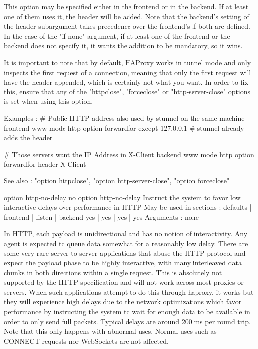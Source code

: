   This option may be specified either in the frontend or in the backend. If at
  least one of them uses it, the header will be added. Note that the backend's
  setting of the header subargument takes precedence over the frontend's if
  both are defined. In the case of the "if-none" argument, if at least one of
  the frontend or the backend does not specify it, it wants the addition to be
  mandatory, so it wins.

  It is important to note that by default, HAProxy works in tunnel mode and
  only inspects the first request of a connection, meaning that only the first
  request will have the header appended, which is certainly not what you want.
  In order to fix this, ensure that any of the "httpclose", "forceclose" or
  "http-server-close" options is set when using this option.

  Examples :
    # Public HTTP address also used by stunnel on the same machine
    frontend www
        mode http
        option forwardfor except 127.0.0.1  # stunnel already adds the header

    # Those servers want the IP Address in X-Client
    backend www
        mode http
        option forwardfor header X-Client

  See also : "option httpclose", "option http-server-close",
             "option forceclose"


option http-no-delay
no option http-no-delay
  Instruct the system to favor low interactive delays over performance in HTTP
  May be used in sections :   defaults | frontend | listen | backend
                                 yes   |    yes   |   yes  |   yes
  Arguments : none

  In HTTP, each payload is unidirectional and has no notion of interactivity.
  Any agent is expected to queue data somewhat for a reasonably low delay.
  There are some very rare server-to-server applications that abuse the HTTP
  protocol and expect the payload phase to be highly interactive, with many
  interleaved data chunks in both directions within a single request. This is
  absolutely not supported by the HTTP specification and will not work across
  most proxies or servers. When such applications attempt to do this through
  haproxy, it works but they will experience high delays due to the network
  optimizations which favor performance by instructing the system to wait for
  enough data to be available in order to only send full packets. Typical
  delays are around 200 ms per round trip. Note that this only happens with
  abnormal uses. Normal uses such as CONNECT requests nor WebSockets are not
  affected.

